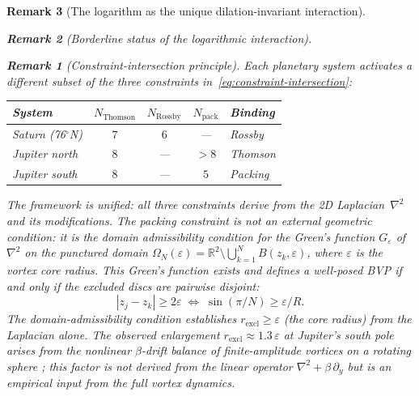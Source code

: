 \documentclass[12pt, a4paper]{article}
\newtheorem{remark}{Remark}[section]
\numberwithin{equation}{section}
\begin{document}
\begin{remark}[The logarithm as the unique dilation-invariant interaction]
\begin{remark}[Borderline status of the logarithmic interaction]
\begin{remark}[Constraint-intersection principle]
\label{rem:constraint-intersection}
Each planetary system activates a different subset of the three
constraints in~\eqref{eq:constraint-intersection}:
\begin{center}
\begin{tabular}{lcccl}
\toprule
System & $N_{\mathrm{Thomson}}$ & $N_{\mathrm{Rossby}}$ & $N_{\mathrm{pack}}$ & Binding \\
\midrule
Saturn (76${}^\circ$N)  & $7$ & $6$ & ---  & Rossby \\
Jupiter north           & $8$ & --- & $>8$ & Thomson \\
Jupiter south           & $8$ & --- & $5$  & Packing \\
\bottomrule
\end{tabular}
\end{center}
The framework is unified: all three constraints derive from the 2D
Laplacian~$\nabla^2$ and its modifications.  The packing constraint
is \emph{not} an external geometric condition: it is the domain
admissibility condition for the Green's function
$G_\varepsilon$ of~$\nabla^2$ on the punctured domain
$\Omega_N(\varepsilon) = \mathbb{R}^2 \setminus
\bigcup_{k=1}^N B(z_k, \varepsilon)$, where $\varepsilon$ is the
vortex core radius.  This Green's function exists and defines a
well-posed BVP if and only if the excluded discs are pairwise disjoint:
\[
  |z_j - z_k| \ge 2\varepsilon
  \;\Longleftrightarrow\;
  \sin(\pi/N) \ge \varepsilon/R.
\]
The domain-admissibility condition establishes
$r_{\mathrm{excl}} \ge \varepsilon$ (the core radius) from the
Laplacian alone.  The observed enlargement
$r_{\mathrm{excl}} \approx 1.3\,\varepsilon$ at Jupiter's south pole
arises from the nonlinear $\beta$-drift balance of finite-amplitude
vortices on a rotating sphere \citep{Gavriel2021}; this factor is
\emph{not} derived from the linear operator $\nabla^2 + \beta\,\partial_y$
but is an empirical input from the full vortex dynamics.


\end{remark}
\end{remark}
\end{remark}
\end{document}
